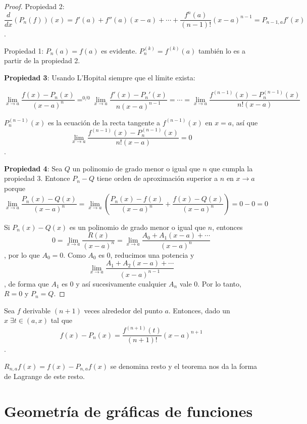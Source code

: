 \documentclass[nochap]{apuntes}
\begin{document}
\begin{proof}
Propiedad 2:
\[\frac{d}{dx}\left(P_n(f)\right)(x)=f'(a)+f''(a)(x-a)+\cdots +\frac{f^{n}(a)}{(n-1)!}(x-a)^{n-1} = P_{n-1,a}f'(x) \].

Propiedad 1: $P_n(a)=f(a)$ es evidente. $P_n^{(k)}=f^{(k)}(a)$ también lo es a partir de la propiedad 2.

\textbf{Propiedad 3}: Usando L'Hopital siempre que el límite exista:

\[ \lim_{x\to a} \frac{f(x)-P_n(x)}{(x-a)^n}=^{0/0}\lim_{x\to a} \frac{f'(x)-P_n'(x)}{n(x-a)^{n-1}}=\cdots=\lim_{x\to a} \frac{f^{(n-1)}(x)-P^{(n-1)}_n(x)}{n!(x-a)} \]

$P_n^{(n-1)}(x)$ es la ecuación de la recta tangente a $f^{(n-1)}(x)$ en $x=a$, así que \[\lim_{x\to a} \frac{f^{(n-1)}(x)-P^{(n-1)}_n(x)}{n!(x-a)}=0\].

\textbf{Propiedad 4}: Sea $Q$ un polinomio de grado menor o igual que $n$ que cumpla la propiedad 3. Entonce $P_n - Q$ tiene orden de aproximación superior a $n$ en $x\to a$ porque \[\lim_{x\to a} \frac{P_n(x)-Q(x)}{(x-a)^n}=\lim_{x\to a} \left(\frac{P_n(x)-f(x)}{(x-a)^n}+\frac{f(x)-Q(x)}{(x-a)^n}\right)=0-0=0 \]

Si $P_n(x) - Q(x)$ es un polinomio de grado menor o igual que $n$, entonces \[0=\lim_{x\to a}\frac{R(x)}{(x-a)^n}=\lim_{x\to a}\frac{A_0+A_1(x-a)+\cdots}{(x-a)^n}\], por lo que $A_0=0$. Como $A_0$ es 0, reducimos una potencia y \[\lim_{x\to a}\frac{A_1+A_2(x-a)+\cdots}{(x-a)^{n-1}}\], de forma que $A_1$ es 0 y así sucesivamente cualquier $A_n$ vale 0. Por lo tanto, $R=0$ y $P_n=Q$.
\end{proof}

\begin{theorem}
Sea $f$ derivable $(n+1)$ veces alrededor del punto $a$. Entonces, dado un $x\;\exists t \in (a,x)$ tal que
\[ f(x)-P_n(x)=\frac{f^{(n+1)}(t)}{(n+1)!}(x-a)^{n+1} \].

\end{theorem}

\begin{defn}[Resto] $R_{n,a}f(x)=f(x)-P_{n,a}f(x)$ se denomina resto y el teorema nos da la forma de Lagrange de este resto.\end{defn}

\section{Geometría de gráficas de funciones}
\end{document}
